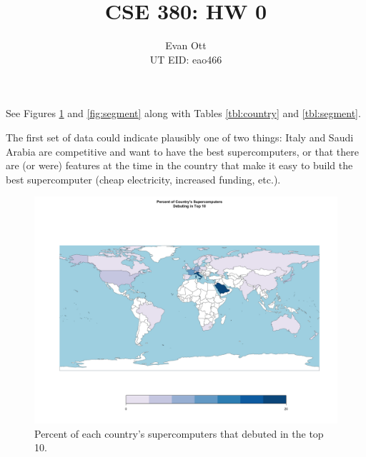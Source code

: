 \documentclass{article}
\title{\vspace{-6ex}CSE 380: HW 0\vspace{-2ex}}
\author{Evan Ott \\ UT EID: eao466\vspace{-2ex}}
\begin{document}
\maketitle
\subsection{}
See Figures \ref{fig:country} and \ref{fig:segment} along with Tables \ref{tbl:country} and \ref{tbl:segment}.

The first
set of data could indicate plausibly one of two things: Italy and Saudi Arabia are competitive and want to have
the best supercomputers, or that there are (or were) features at the time in the country that make it easy to
build the best supercomputer (cheap electricity, increased funding, etc.).


\begin{figure}[h]
\begin{center}
\includegraphics[scale=0.3]{country.png}
\caption{\label{fig:country}Percent of each country's supercomputers that debuted in the top 10.}
\end{center}
\end{figure}
\end{document}
